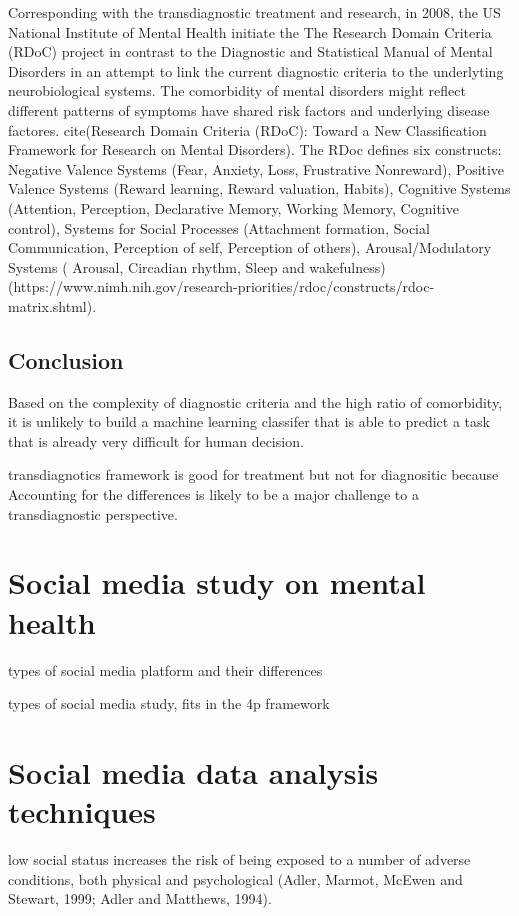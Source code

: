 Corresponding with the transdiagnostic treatment and research, in 2008, the US National Institute of Mental Health initiate the The Research Domain Criteria (RDoC) project in contrast to the  Diagnostic and Statistical Manual of Mental Disorders in an attempt to link the current diagnostic criteria to the underlyting neurobiological systems. The comorbidity of mental disorders might reflect different patterns of symptoms have shared risk factors and underlying disease factores. cite(Research Domain Criteria (RDoC): Toward a New Classification Framework for Research on Mental Disorders). The RDoc defines six constructs: Negative Valence Systems (Fear, Anxiety, Loss, Frustrative Nonreward), Positive Valence Systems (Reward learning, Reward valuation, Habits), Cognitive Systems (Attention, Perception, Declarative Memory, Working Memory, Cognitive control), Systems for Social Processes (Attachment formation, Social Communication, Perception of self, Perception of others), Arousal/Modulatory Systems (
Arousal, Circadian rhythm, Sleep and wakefulness) (https://www.nimh.nih.gov/research-priorities/rdoc/constructs/rdoc-matrix.shtml). 


\subsection{Conclusion}
 
Based on the complexity of diagnostic criteria and the high ratio of comorbidity, it is unlikely to build a machine learning classifer that is able to predict a task that is already very difficult for human decision.



transdiagnotics framework is good for treatment but not for diagnositic because Accounting for the differences is likely to be a major challenge to a transdiagnostic perspective.




\section{Social media study on mental health}

types of social media platform and their differences

types of social media study, fits in the 4p framework






\section{Social media data analysis techniques}

low social status increases the risk of being exposed to a number of adverse conditions, both physical and psychological (Adler, Marmot, McEwen and Stewart, 1999; Adler and Matthews, 1994). 











